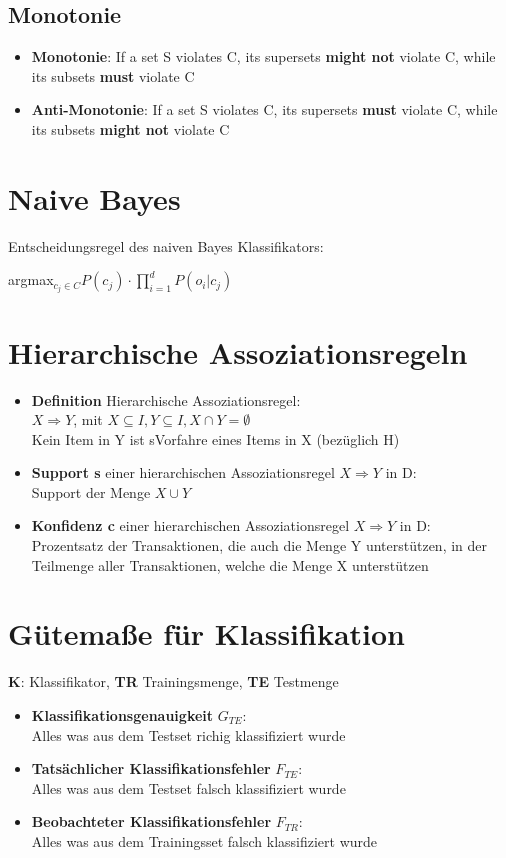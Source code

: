 \documentclass{article}
\begin{document}
\subsection{Monotonie}
\begin{itemize}
    \item \textbf{Monotonie}: If a set S violates C, its supersets
    \textbf{might not} violate C, while its subsets \textbf{must}
    violate C
    \item \textbf{Anti-Monotonie}: If a set S violates C, its supersets
    \textbf{must} violate C, while its subsets \textbf{might not}
    violate C
\end{itemize}
\section{Naive Bayes}
Entscheidungsregel des naiven Bayes Klassifikators:
\begin{center}
    argmax$_{c_j \in C} P(c_j) \cdot \prod_{i = 1}^{d} P(o_i | c_j)$ 
\end{center}
\section{Hierarchische Assoziationsregeln}
\begin{itemize}
    \item \textbf{Definition} Hierarchische Assoziationsregel: \\
    $X \Rightarrow Y$, mit $X \subseteq I, Y \subseteq I, X \cap Y = \emptyset$ \\
    Kein Item in Y ist sVorfahre eines Items in X (bezüglich H)
    \item \textbf{Support s} einer hierarchischen Assoziationsregel
    $X \Rightarrow Y$ in D: \\
    Support der Menge $X \cup Y$
    \item \textbf{Konfidenz c} einer hierarchischen Assoziationsregel
    $X \Rightarrow Y$ in D: \\
    Prozentsatz der Transaktionen, die auch die Menge Y unterstützen,
    in der Teilmenge aller Transaktionen, welche die Menge X unterstützen
\end{itemize}
\section{Gütemaße für Klassifikation}
\textbf{K}: Klassifikator, \textbf{TR} Trainingsmenge, \textbf{TE} 
Testmenge
\begin{itemize}
    \item \textbf{Klassifikationsgenauigkeit} $G_{TE}$: \\
    Alles was aus dem Testset richig klassifiziert wurde
    \item \textbf{Tatsächlicher Klassifikationsfehler} $F_{TE}$: \\
    Alles was aus dem Testset falsch klassifiziert wurde
    \item \textbf{Beobachteter Klassifikationsfehler} $F_{TR}$: \\
    Alles was aus dem Trainingsset falsch klassifiziert wurde
\end{itemize}
\end{document}
